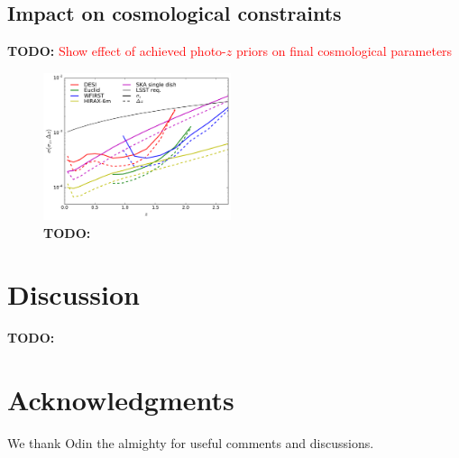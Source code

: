 \documentclass[prd,twocolumn]{revtex4}
\newcommand{\TODO}[1]{{\bf TODO:} \textcolor{red}{#1}}
\begin{document}
  \subsection{Impact on cosmological constraints} \label{ssec:results.cosmo}
    \TODO{Show effect of achieved photo-$z$ priors on final cosmological parameters}

    \begin{figure}
      \centering
      \includegraphics[width=0.49\textwidth]{photoz_calib_compare}
      \caption{\TODO{}}
      \label{fig:fisher}
    \end{figure}

\section{Discussion}\label{ssec:discuss}
  \TODO{\lipsum[12]}

\section*{Acknowledgments}
  We thank Odin the almighty for useful comments and discussions.
 

\end{document}
